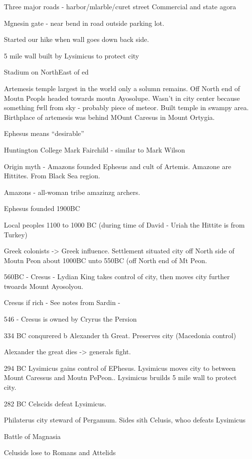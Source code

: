 \documentclass[
]{book}
\begin{document}
Three major roads - harbor/mlarble/curet street
Commercial and state agora

Mgnesin gate - near bend in road outside parking lot.

Started our hike when wall goes down back side.

5 mile wall built by Lysimicus to protect city

Stadium on NorthEast of ed

Artemesis temple largest in the world only a solumn remains. Off North end of Moutn Peopls headed towards moutn Ayosolupe. Wasn't in city center because something fwll from sky - probably piece of meteor. Built temple in swampy area. Birthplace of artemesis was behind MOunt Caresus in Mount Ortygia.

Ephesus means ``desirable''

Huntington College Mark Fairchild - similar to Mark Wilson

Origin myth - Amazons founded Ephesus and cult of Artemis. Amazone are Hittites. From Black Sea region.

Amazons - all-woman tribe amazinzg archers.

Ephesus founded 1900BC

Local peoples 1100 to 1000 BC (during time of David - Uriah the Hittite is from Turkey)

Greek colonists -\textgreater{} Greek influence. Settlement situated city off North side of Moutn Peon about 1000BC unto 550BC (off North end of Mt Peon.

560BC - Cresus - Lydian King takes control of city, then moves city further twoards Mount Ayosolyou.

Cresus if rich - See notes from Sardin -

546 - Cresus is owned by Cryrus the Persion

334 BC conqurered b Alexander th Great. Preserves city (Macedonia control)

Alexander the great dies -\textgreater{} generals fight.

294 BC Lysimicus gains control of EPhesus. Lysimicus moves city to between Mount Caressus and Moutn PePeon.. Lysimicus bruilds 5 mile wall to protect city.

282 BC Celscids defeat Lysimicus.

Philaterus city steward of Pergamum. Sides sith Celusis, whoo defeats Lysimicus

Battle of Magnasia

Celusids lose to Romans and Attelids
\end{document}
